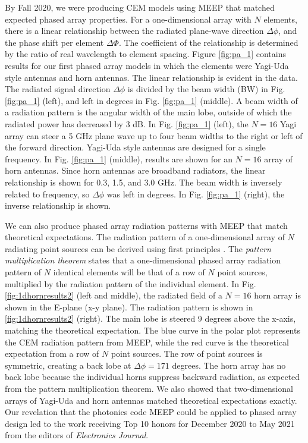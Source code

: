 \documentclass[../../main.tex]{subfiles}
\begin{document}
By Fall 2020, we were producing CEM models using MEEP that matched expected phased array properties.  For a one-dimensional array with $N$ elements, there is a linear relationship between the radiated plane-wave direction $\Delta \phi$, and the phase shift per element $\Delta \Phi$.  The coefficient of the relationship is determined by the ratio of real wavelength to element spacing.  Figure \ref{fig:pa_1} contains results for our first phased array models in which the elements were Yagi-Uda style antennas and horn antennas.  The linear relationship is evident in the data.  The radiated signal direction $\Delta \phi$ is divided by the beam width (BW) in Fig. \ref{fig:pa_1} (left), and left in degrees in Fig. \ref{fig:pa_1} (middle).  A beam width of a radiation pattern is the angular width of the main lobe, outside of which the radiated power has decreased by 3 dB.  In Fig. \ref{fig:pa_1} (left), the $N=16$ Yagi array can steer a 5 GHz plane wave up to four beam widths to the right or left of the forward direction.  Yagi-Uda style antennas are designed for a single frequency.  In Fig. \ref{fig:pa_1} (middle), results are shown for an $N=16$ array of horn antennas.  Since horn antennas are broadband radiators, the linear relationship is shown for 0.3, 1.5, and 3.0 GHz.  The beam width is inversely related to frequency, so $\Delta \phi$ was left in degrees.  In Fig. \ref{fig:pa_1} (right), the inverse relationship is shown. \\ \vspace{2.5mm}

We can also produce phased array radiation patterns with MEEP that match theoretical expectations.  The radiation pattern of a one-dimensional array of $N$ radiating point sources can be derived using first principles \cite{electronics10040415}.  The \textit{pattern multiplication theorem} states that a one-dimensional phased array radiation pattern of $N$ identical elements will be that of a row of $N$ point sources, multiplied by the radiation pattern of the individual element.  In Fig. \ref{fig:1dhornresults2} (left and middle), the radiated field of a $N=16$ horn array is shown in the E-plane (x-y plane).  The radiation pattern is shown in \ref{fig:1dhornresults2} (right).  The main lobe is steered 9 degrees above the x-axis, matching the theoretical expectation.  The blue curve in the polar plot represents the CEM radiation pattern from MEEP, while the red curve is the theoretical expectation from a row of $N$ point sources.  The row of point sources is symmetric, creating a back lobe at $\Delta \phi = 171$ degrees.  The horn array has no back lobe because the individual horns suppress backward radiation, as expected from the pattern multiplication theorem.  We also showed that two-dimensional arrays of Yagi-Uda and horn antennas matched theoretical expectations exactly.  Our revelation that the photonics code MEEP could be applied to phased array design led to the work receiving Top 10 honors for December 2020 to May 2021 from the editors of \textit{Electronics Journal}. \\ \vspace{2.5mm}
\end{document}
